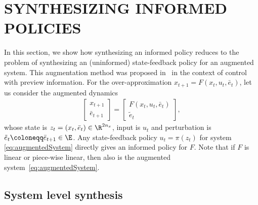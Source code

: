 \documentclass[letterpaper, 10 pt, conference]{ieeeconf}  %
\begin{document}
\section{SYNTHESIZING INFORMED POLICIES} \label{sec:synthesizingIP}

In this section, we show how synthesizing an informed policy reduces to the problem of synthesizing an (uninformed) state-feedback policy for an augmented system. This augmentation method was proposed in~\cite{liu2021value, liu2024quantifying} in the context of control with preview information. For the over-approximation $x_{t+1}=F(x_t,u_t,\bar{e}_t)$, let us consider the augmented dynamics
\begin{align} \label{eq:augmentedSystem}
\begin{bmatrix}x_{t+1}\\ \bar{e}_{t+1}\end{bmatrix} =\begin{bmatrix}F(x_t,u_t,\bar{e}_t)\\ \tilde{e}_t\end{bmatrix},
\end{align}
whose state is $z_t=(x_t,\bar{e}_t)\in\R^{2n_x}$, input is $u_t$ and perturbation is $\tilde{e}_t\coloneqq \bar{e}_{t+1}\in \E$. Any state-feedback policy $u_t=\pi(z_t)$ for system \eqref{eq:augmentedSystem} directly gives an informed policy for $F$. Note that if $F$ is linear or piece-wise linear, then also is the augmented system~\eqref{eq:augmentedSystem}.

\subsection{System level synthesis}
\end{document}
